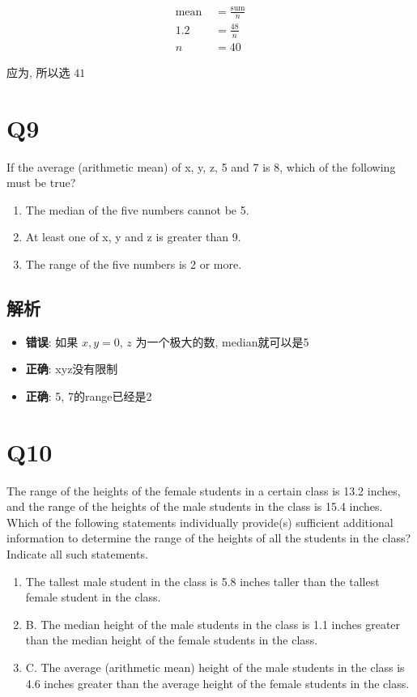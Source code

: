     \begin{align*}
      \text{mean } &= \frac{\text{sum}}{n} \\
      1.2 &= \frac{48}{n} \\
      n &= 40
    \end{align*}

    应为, 所以选 $ 41 $

\section{Q9}

  If the average (arithmetic mean) of x, y, z, 5 and 7 is 8, which of the
  following must be true?

  \begin{enumerate}
    \item The median of the five numbers cannot be 5.
    \item At least one of x, y and z is greater than 9.
    \item The range of the five numbers is 2 or more.
  \end{enumerate}

  \subsection{解析}

    \begin{itemize}
      \item \textbf{错误}: 如果 $ x, y = 0 $, $ z $ 为一个极大的数, median就可以是5
      \item \textbf{正确}: xyz没有限制
      \item \textbf{正确}: 5, 7的range已经是2
    \end{itemize}

\section{Q10}

  The range of the heights of the female students in a certain class is 13.2
  inches, and the range of the heights of the male students in the class is
  15.4 inches. Which of the following statements individually provide(s)
  sufficient additional information to determine the range of the heights
  of all the students in the class? Indicate all such statements.

  \begin{enumerate}
    \item The tallest male student in the class is 5.8 inches taller than the
    tallest female student in the class.
    \item B. The median height of the male students in the class is 1.1 inches
    greater than the median height of the female students in the class.
    \item C. The average (arithmetic mean) height of the male students in the
    class is 4.6 inches greater than the average height of the female students
    in the class.
  \end{enumerate}

